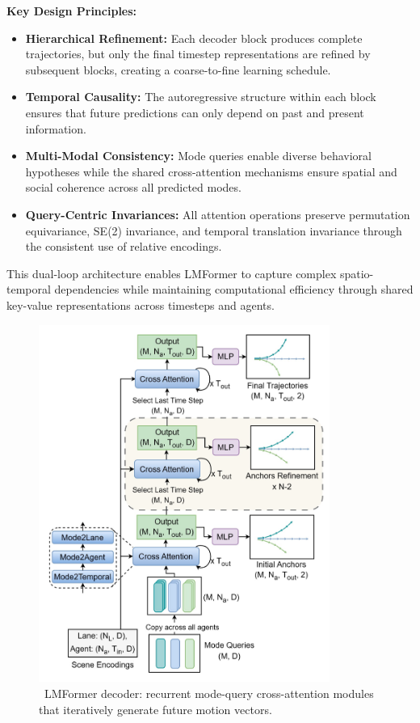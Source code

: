 \textbf{Key Design Principles:}
\begin{itemize}[leftmargin=*]
\item \textbf{Hierarchical Refinement:} Each decoder block produces complete trajectories, but only the final timestep representations are refined by subsequent blocks, creating a coarse-to-fine learning schedule.
\item \textbf{Temporal Causality:} The autoregressive structure within each block ensures that future predictions can only depend on past and present information.
\item \textbf{Multi-Modal Consistency:} Mode queries enable diverse behavioral hypotheses while the shared cross-attention mechanisms ensure spatial and social coherence across all predicted modes.
\item \textbf{Query-Centric Invariances:} All attention operations preserve permutation equivariance, SE(2) invariance, and temporal translation invariance through the consistent use of relative encodings.
\end{itemize}

This dual-loop architecture enables LMFormer to capture complex spatio-temporal dependencies while maintaining computational efficiency through shared key-value representations across timesteps and agents.

\begin{figure}[ht]
  \centering
  \includegraphics[width=0.85\textwidth]{figures/lmformer_arch_decoder.png}
  \caption{\cite{lmformerYadav2025}~LMFormer decoder: recurrent mode-query cross-attention modules that iteratively generate future motion vectors.}
  \label{fig:lmformer_arch_decoder}
\end{figure}

